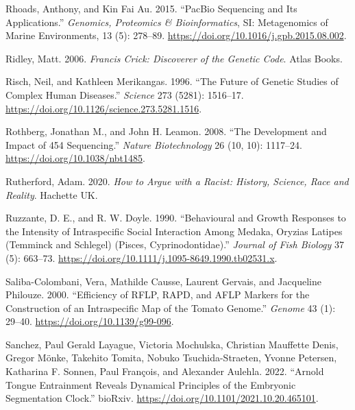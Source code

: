 \documentclass[
]{book}
\newlength{\cslhangindent}
\newlength{\cslentryspacingunit} %
\newenvironment{CSLReferences}[2] %
 {%
  \setlength{\parindent}{0pt}
  \ifodd #1
  \let\oldpar\par
  \def\par{\hangindent=\cslhangindent\oldpar}
  \fi
  \setlength{\parskip}{#2\cslentryspacingunit}
 }%
 {}
\begin{document}
\begin{CSLReferences}{1}{0}
\leavevmode{}%
Rhoads, Anthony, and Kin Fai Au. 2015. {``{PacBio Sequencing} and {Its Applications}.''} \emph{Genomics, Proteomics \& Bioinformatics}, {SI}: {Metagenomics} of {Marine Environments}, 13 (5): 278--89. \url{https://doi.org/10.1016/j.gpb.2015.08.002}.

\leavevmode{}%
Ridley, Matt. 2006. \emph{Francis {Crick}: Discoverer of the Genetic Code}. {Atlas Books}.

\leavevmode{}%
Risch, Neil, and Kathleen Merikangas. 1996. {``The {Future} of {Genetic Studies} of {Complex Human Diseases}.''} \emph{Science} 273 (5281): 1516--17. \url{https://doi.org/10.1126/science.273.5281.1516}.

\leavevmode{}%
Rothberg, Jonathan M., and John H. Leamon. 2008. {``The Development and Impact of 454 Sequencing.''} \emph{Nature Biotechnology} 26 (10, 10): 1117--24. \url{https://doi.org/10.1038/nbt1485}.

\leavevmode{}%
Rutherford, Adam. 2020. \emph{How to Argue with a Racist: {History}, Science, Race and Reality}. {Hachette UK}.

\leavevmode{}%
Ruzzante, D. E., and R. W. Doyle. 1990. {``Behavioural and Growth Responses to the Intensity of Intraspecific Social Interaction Among Medaka, {Oryzias} Latipes ({Temminck} and {Schlegel}) ({Pisces}, {Cyprinodontidae}).''} \emph{Journal of Fish Biology} 37 (5): 663--73. \url{https://doi.org/10.1111/j.1095-8649.1990.tb02531.x}.

\leavevmode{}%
Saliba-Colombani, Vera, Mathilde Causse, Laurent Gervais, and Jacqueline Philouze. 2000. {``Efficiency of {RFLP}, {RAPD}, and {AFLP} Markers for the Construction of an Intraspecific Map of the Tomato Genome.''} \emph{Genome} 43 (1): 29--40. \url{https://doi.org/10.1139/g99-096}.

\leavevmode{}%
Sanchez, Paul Gerald Layague, Victoria Mochulska, Christian Mauffette Denis, Gregor Mönke, Takehito Tomita, Nobuko Tsuchida-Straeten, Yvonne Petersen, Katharina F. Sonnen, Paul François, and Alexander Aulehla. 2022. {``Arnold Tongue Entrainment Reveals Dynamical Principles of the Embryonic Segmentation Clock.''} {bioRxiv}. \url{https://doi.org/10.1101/2021.10.20.465101}.


\end{CSLReferences}
\end{document}
